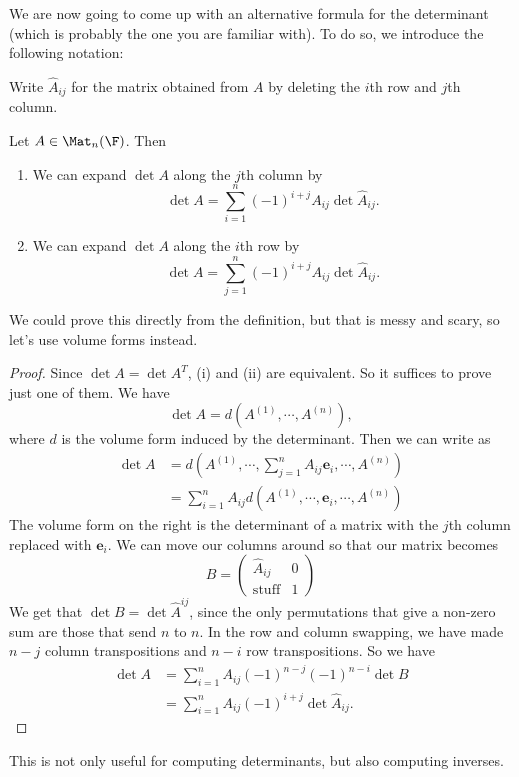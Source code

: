 \documentclass[a4paper]{article}
\begin{document}
We are now going to come up with an alternative formula for the determinant (which is probably the one you are familiar with). To do so, we introduce the following notation:
\begin{notation}
  Write $\hat{A}_{ij}$ for the matrix obtained from $A$ by deleting the $i$th row and $j$th column.
\end{notation}

\begin{lemma}
  Let $A \in \Mat_n(\F)$. Then
  \begin{enumerate}
    \item We can expand $\det A$ along the $j$th column by
      \[
        \det A = \sum_{i = 1}^n (-1)^{i + j} A_{ij} \det \hat{A}_{ij}.
      \]
    \item We can expand $\det A$ along the $i$th row by
      \[
        \det A = \sum_{j = 1}^n (-1)^{i + j} A_{ij} \det \hat{A}_{ij}.
      \]
  \end{enumerate}
\end{lemma}
We could prove this directly from the definition, but that is messy and scary, so let's use volume forms instead.

\begin{proof}
  Since $\det A = \det A^T$, (i) and (ii) are equivalent. So it suffices to prove just one of them. We have
  \[
    \det A = d(A^{(1)}, \cdots, A^{(n)}),
  \]
  where $d$ is the volume form induced by the determinant. Then we can write as
  \begin{align*}
    \det A &= d\left(A^{(1)}, \cdots, \sum_{j = 1}^n A_{ij} \mathbf{e}_i, \cdots, A^{(n)}\right)\\
    &= \sum_{i = 1}^n A_{ij} d(A^{(1)}, \cdots, \mathbf{e}_i, \cdots, A^{(n)})
  \end{align*}
  The volume form on the right is the determinant of a matrix with the $j$th column replaced with $\mathbf{e}_i$. We can move our columns around so that our matrix becomes
  \[
    B =
    \begin{pmatrix}
      \hat{A}_{ij} & 0\\
      \mathrm{stuff} & 1
    \end{pmatrix}
  \]
  We get that $\det B = \det \hat{A}^{ij}$, since the only permutations that give a non-zero sum are those that send $n$ to $n$. In the row and column swapping, we have made $n - j$ column transpositions and $n - i$ row transpositions. So we have
  \begin{align*}
    \det A &= \sum_{i = 1}^n A_{ij} (-1)^{n - j} (-1)^{n - i}\det B\\
    &= \sum_{i = 1}^n A_{ij} (-1)^{i + j} \det \hat{A}_{ij}.
  \end{align*}
\end{proof}
This is not only useful for computing determinants, but also computing inverses.
\end{document}
